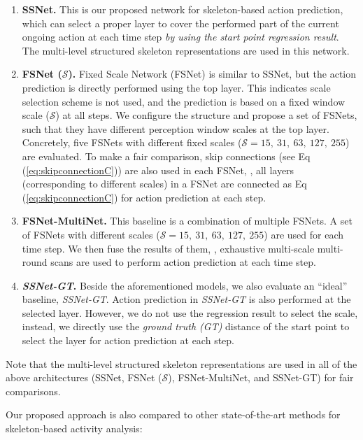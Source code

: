 \documentclass[10pt,twocolumn,letterpaper]{article}
\begin{document}
\begin{enumerate}
  \item
\textbf{SSNet.}
This is our proposed network for skeleton-based action prediction,
which can select a proper layer to cover the performed part of the current ongoing action at each time step \emph{by using the start point regression result}.
The multi-level structured skeleton representations are used in this network.




\item
\textbf{FSNet ($\mathcal{S}$).}
Fixed Scale Network (FSNet) is similar to SSNet,
but the action prediction is directly performed using the top layer.
This indicates scale selection scheme is not used,
and the prediction is based on a fixed window scale ($\mathcal{S}$) at all steps.
We configure the structure and propose a set of FSNets,
such that they have different perception window scales at the top layer.
Concretely, five FSNets with different fixed scales ($\mathcal{S} = 15,~31,~63,~127,~255$) are evaluated.
To make a fair comparison,
skip connections (see Eq (\ref{eq:skipconnectionC})) are also used in each FSNet,
\ie, all layers (corresponding to different scales) in a FSNet are connected as Eq (\ref{eq:skipconnectionC}) for action prediction at each step.
\item
\textbf{FSNet-MultiNet.}
This baseline is a combination of multiple FSNets.
A set of FSNets with different scales ($\mathcal{S} = 15,~31,~63,~127,~255$) are used for each time step.
We then fuse the results of them, \ie, exhaustive multi-scale multi-round scans are used to perform action prediction at each time step.
  \item
\textbf{\emph{SSNet-GT}.}
Beside the aforementioned models, we also evaluate an ``ideal'' baseline, \emph{SSNet-GT}.
Action prediction in \emph{SSNet-GT} is also performed at the selected layer.
However, we do not use the regression result to select the scale,
instead, we directly use the \emph{ground truth (GT)} distance of the start point to select the layer for action prediction at each step.
\end{enumerate}


Note that the multi-level structured skeleton representations are used
in all of the above architectures (SSNet, FSNet ($\mathcal{S}$), FSNet-MultiNet, and SSNet-GT) for fair comparisons.

Our proposed approach is also compared to other state-of-the-art methods for skeleton-based activity analysis:
\end{document}
